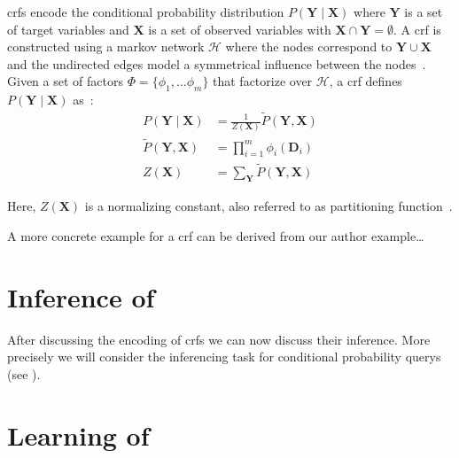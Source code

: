 \Glspl{crf} encode the \gls{conditional probability distribution} $P(\bm{Y}\mid\bm{X})$ where $\bm{Y}$ is a set of \glspl{target variable} and $\bm{X}$ is a set of \glspl{observed variable} with $\bm{X}\cap\bm{Y}=\emptyset$.
A \gls{crf} is constructed using a \gls{markov network} $\mathcal{H}$ where the nodes correspond to $\bm{Y}\cup\bm{X}$ and the undirected edges model a symmetrical influence between the nodes~\citep{koller2009probabilistic}.
Given a set of \glspl{factor} $\Phi=\{\phi_1,\dots\phi_m\}$ that factorize over $\mathcal{H}$, a \gls{crf} defines $P(\bm{Y}\mid\bm{X})$ as~\citep{koller2009probabilistic}:
\begin{equation}
  \label{equ:crf}
  \begin{split}
    P(\bm{Y}\mid\bm{X}) & = \frac{1}{Z(\bm{X})}\tilde{P}(\bm{Y},\bm{X}) \\
    \tilde{P}(\bm{Y},\bm{X}) &= \prod_{i=1}^{m}\phi_i(\bm{D}_i) \\
    Z(\bm{X}) & = \sum_{\bm{Y}}\tilde{P}(\bm{Y},\bm{X})
  \end{split}
\end{equation}

Here, $Z(\bm{X})$ is a normalizing constant, also referred to as partitioning function~\citep{koller2009probabilistic}.

\bigskip

A more concrete example for a \gls{crf} can be derived from our author example\dots

\section{Inference of }\label{sec:inference-crfs}

After discussing the encoding of \glspl{crf} we can now discuss their inference.
More precisely we will consider the inferencing task for \glspl{conditional probability query} (see ).



\section{Learning of }\label{sec:learning-crfs}


